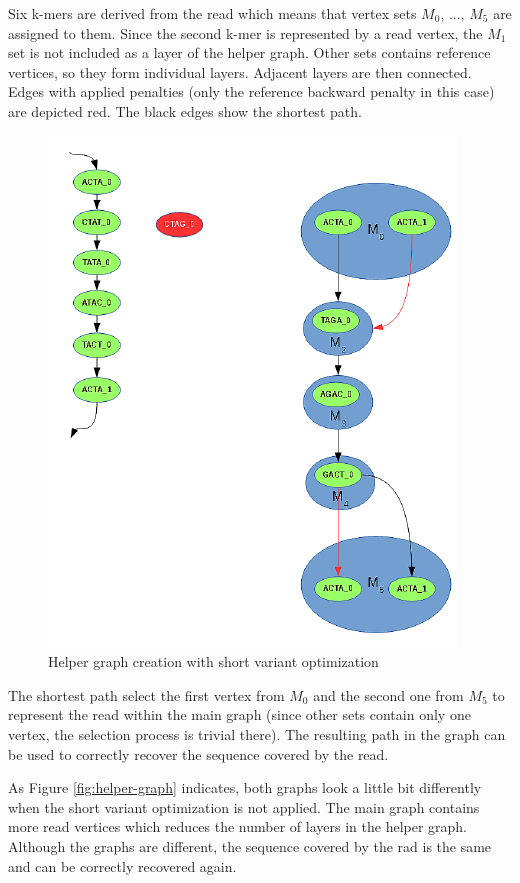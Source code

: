 Six k-mers are derived from the read which means that vertex sets $M_0$, ..., $M_5$ are assigned to them. Since the second k-mer is represented by a read vertex, the $M_1$ set is not included as a layer of the helper graph. Other sets contains reference vertices, so they form individual layers. Adjacent layers are then connected. Edges with applied penalties (only the reference backward penalty in this case) are depicted red. The black edges show the shortest path.

\begin{figure}[h]
	\centering
	\includegraphics{img/helper-graph-short.pdf}
	\caption{Helper graph creation with short variant optimization}
	\label{fig:helper-graph-short}
\end{figure}

The shortest path select the first vertex from $M_0$ and the second one from $M_5$ to represent the read within the main graph (since other sets contain only one vertex, the selection process is trivial there). The resulting path in the graph can be used to correctly recover the sequence covered by the read.

As Figure \ref{fig:helper-graph} indicates, both graphs look a little bit differently when the short variant optimization is not applied. The main graph contains more read vertices which reduces the number of layers in the helper graph. Although the graphs are different, the sequence covered by the rad is the same and can be correctly recovered again.

